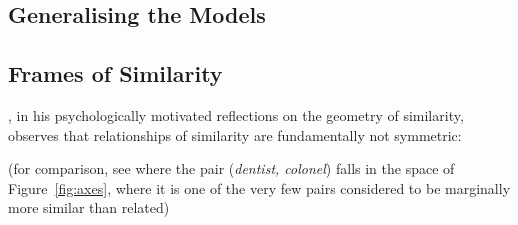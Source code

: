\subsection{Generalising the Models}

\subsection{Frames of Similarity}
\cite{Tversky1977}, in his psychologically motivated reflections on the geometry of similarity, observes that relationships of similarity are fundamentally not symmetric: 

(for comparison, see where the pair (\emph{dentist, colonel}) falls in the space of Figure~\ref{fig:axes}, where it is one of the very few pairs considered to be marginally more similar than related)
